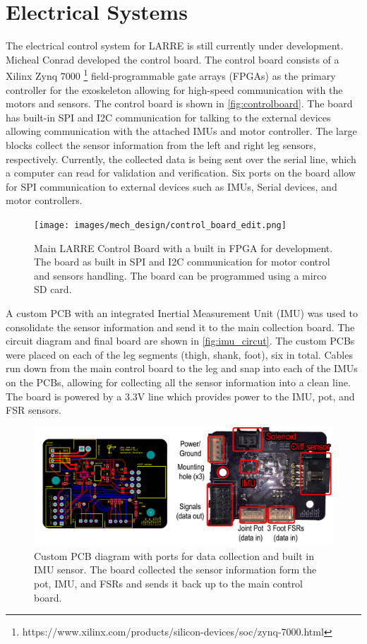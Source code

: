\section{Electrical Systems}

The electrical control system for LARRE is still currently under development. Micheal Conrad developed the control board. The control board consists of a  Xilinx Zynq 7000 \footnote{https://www.xilinx.com/products/silicon-devices/soc/zynq-7000.html}  field-programmable gate arrays (FPGAs) as the primary controller for the exoskeleton allowing for high-speed communication with the motors and sensors. The control board is shown in \autoref{fig:controlboard}. The board has built-in SPI and I2C communication for talking to the external devices allowing communication with the attached IMUs and motor controller. The large blocks collect the sensor information from the left and right leg sensors, respectively. Currently, the collected data is being sent over the serial line, which a computer can read for validation and verification. Six ports on the board allow for SPI communication to external devices such as IMUs, Serial devices, and motor controllers. 


\begin{figure}
    \centering
    \texttt{[image: images/mech\_design/control\_board\_edit.png]}
    \caption[LARRE Control Board]{Main LARRE Control Board with a built in FPGA for development. The board as built in SPI and I2C communication for motor control and sensors handling. The board can be programmed using a mirco SD card. }
    \label{fig:controlboard}
\end{figure}


A custom PCB with an integrated Inertial Measurement Unit (IMU) was used to consolidate the sensor information and send it to the main collection board. The circuit diagram and final board are shown in \autoref{fig:imu_circut}. The custom PCBs were placed on each of the leg segments (thigh, shank, foot), six in total. Cables run down from the main control board to the leg and snap into each of the IMUs on the PCBs, allowing for collecting all the sensor information into a clean line. The board is powered by a 3.3V line which provides power to the IMU, pot, and FSR sensors.


\begin{figure}
    \centering
    \includegraphics[scale=0.23]{images/mech_design/IMU_diagram.png}
    \caption[Custom PCB Diagram]{Custom PCB diagram with ports for data collection and built in IMU sensor. The board collected the sensor information form the pot, IMU, and FSRs and sends it back up to the main control board.}
    \label{fig:imu_circut}
\end{figure}

